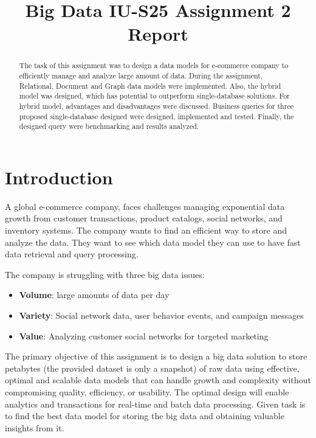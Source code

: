 \documentclass[conference]{IEEEtran}
\begin{document}
\title{Big Data IU-S25 Assignment 2 Report}

\author{
}

\maketitle

\begin{abstract}

    The task of this assignment was to design a data models for e-commerce company to efficiently manage and analyze large amount of data. During the assignment, Relational, Document and Graph data models were implemented. Also, the hybrid model was designed, which has potential to outperform single-database solutions. For hybrid model, advantages and disadvantages were discussed. Business queries for three proposed single-database designed were designed, implemented and tested. Finally, the designed query were benchmarking and results analyzed.

\end{abstract}

\section{Introduction}
A global e-commerce company, faces challenges managing exponential data growth from customer transactions, product catalogs, social networks, and inventory systems. The company wants to find an efficient way to store and analyze the data. They want to see which data model they can use to have fast data retrieval and query processing.

The company is struggling with three big data issues:
\begin{itemize}
    \item \textbf{Volume}: large amounts of data per day
    \item \textbf{Variety}: Social network data, user behavior events, and campaign messages
    \item \textbf{Value}: Analyzing customer social networks for targeted marketing
\end{itemize}

The primary objective of this assignment is to design a big data solution to store petabytes (the provided dataset is only a snapshot) of raw data using effective, optimal and scalable data models that can handle growth and complexity without compromising quality, efficiency, or usability. The optimal design will enable analytics and transactions for real-time and batch data processing. Given task is to find the best data model for storing the big data and obtaining valuable insights from it.
\end{document}
